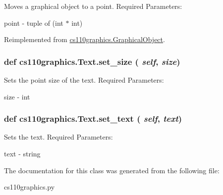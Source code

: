 Moves a graphical object to a point. Required Parameters:
\begin{DoxyItemize}
\item point -\/ tuple of (int $\ast$ int) 
\end{DoxyItemize}

Reimplemented from \hyperlink{classcs110graphics_1_1GraphicalObject_abe2d480265df7ac9447205c52c6946df}{cs110graphics.GraphicalObject}.\hypertarget{classcs110graphics_1_1Text_ad470aa26235fc2f5f1459c3750251207}{
\subsubsection[{set\_\-size}]{\setlength{\rightskip}{0pt plus 5cm}def cs110graphics.Text.set\_\-size ( {\em self}, \/   {\em size})}}
\label{classcs110graphics_1_1Text_ad470aa26235fc2f5f1459c3750251207}


Sets the point size of the text. Required Parameters:
\begin{DoxyItemize}
\item size -\/ int 
\end{DoxyItemize}\hypertarget{classcs110graphics_1_1Text_ab12aa7478ca6a2b2015b7e8544674c73}{
\subsubsection[{set\_\-text}]{\setlength{\rightskip}{0pt plus 5cm}def cs110graphics.Text.set\_\-text ( {\em self}, \/   {\em text})}}
\label{classcs110graphics_1_1Text_ab12aa7478ca6a2b2015b7e8544674c73}


Sets the text. Required Parameters:
\begin{DoxyItemize}
\item text -\/ string 
\end{DoxyItemize}

The documentation for this class was generated from the following file:\begin{DoxyCompactItemize}
\item 
cs110graphics.py\end{DoxyCompactItemize}
